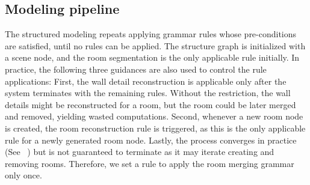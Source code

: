 


\subsection{Modeling pipeline}

The structured modeling repeats applying grammar rules whose
pre-conditions are satisfied, until no rules can be applied.  The
structure graph is initialized with a scene node, and the room
segmentation is the only applicable rule initially.  In practice, the
following three guidances are also used to control the rule applications:
First, the wall detail reconstruction is applicable only after the
system terminates with the remaining rules.  Without the restriction,
the wall details might be reconstructed for a room, but the room could
be later merged and removed, yielding wasted computations. Second,
whenever a new room node is created, the room reconstruction rule is
triggered, as this is the only applicable rule for a newly generated
room node.
Lastly, the process converges in practice (See ~) but is
not guaranteed to terminate as it may iterate creating and removing
rooms. Therefore, we set a rule to apply the room merging grammar only
once.
 


